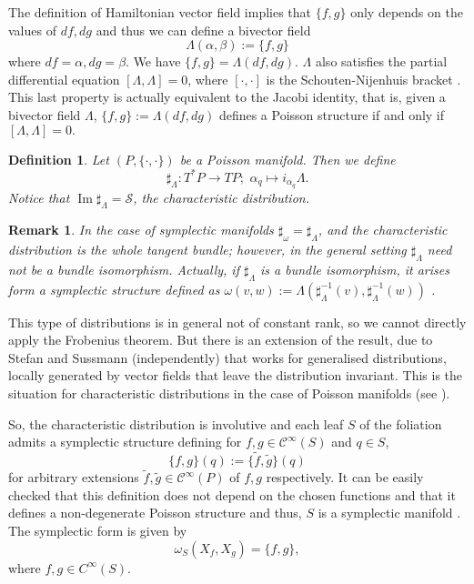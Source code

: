 \documentclass[12pt]{article}
\newtheorem{Def}{Definition}[section]
\newtheorem{remark}{Remark}[section]
\newcommand{\im}{\operatorname{Im}}
\begin{document}
The definition of Hamiltonian vector field implies that $\{f,g\}$ only depends on the values of $df, dg$ and thus we can define a bivector field $$ \Lambda(\alpha, \beta):= \{f,g\}$$ where $df = \alpha, dg = \beta.$ We have $\{f,g\} = \Lambda(df,dg).$ $\Lambda$ also satisfies the partial differential equation $[\Lambda, \Lambda] = 0$, where $[\cdot, \cdot]$ is the Schouten-Nijenhuis bracket  \cites{vaisman2012lectures}. This last property is actually equivalent to the Jacobi identity, that is, given a bivector field $\Lambda$, $\{f,g\}:= \Lambda(df,dg)$ defines a Poisson structure if and only if $[\Lambda, \Lambda] = 0.$\\

\begin{Def} Let $(P, \{\cdot, \cdot \})$ be a Poisson manifold. Then we define $$\sharp_\Lambda: T^*P \rightarrow TP; \,\, \alpha_q \mapsto i_{\alpha_q}\Lambda.$$ Notice that $\im \sharp_\Lambda = \mathcal{S}$, the characteristic distribution.
\end{Def}

\medskip

\begin{remark}{\rm 
    In the case of symplectic manifolds $\sharp_ \omega = \sharp_\Lambda$, and the characteristic distribution is the whole tangent bundle; however, in the general setting $\sharp_\Lambda$ need not be a bundle isomorphism. Actually, if $\sharp_\Lambda$ is a bundle isomorphism, it arises form a symplectic structure defined as $\omega(v,w):= \Lambda(\sharp_\Lambda^{-1}(v), \sharp_\Lambda^{-1}(w))$ \cites{de2011methods}.}
\end{remark}

This type of distributions is in general not of constant rank, so we cannot directly apply the Frobenius theorem. But there is an extension of the result, due to Stefan \cites{stefan} and Sussmann \cite{sussmann1973orbits} (independently) that works for generalised distributions, locally generated by vector fields that leave the distribution invariant. This is the situation for characteristic distributions in the case of Poisson manifolds (see \cites{libermann2012symplectic}).

So, the characteristic distribution is involutive  and each leaf $S$ of the foliation admits a symplectic structure defining for $f,g \in \mathcal{C}^\infty(S)$ and $q \in S$, $$\{f,g\}(q) := \{\widetilde f, \widetilde g\}(q)$$ for arbitrary extensions $\widetilde f,\widetilde g \in\mathcal{C}^\infty(P)$ of $f,g$ respectively. It can be easily checked that this definition does not depend on the chosen functions and that it defines a non-degenerate Poisson structure and thus, $S$ is a symplectic manifold \cites{vaisman2012lectures}.
The symplectic form is given by $$\omega_S(X_f, X_g) = \{f,g\},$$ where $f, g \in C^\infty(S).$ \\
\end{document}
